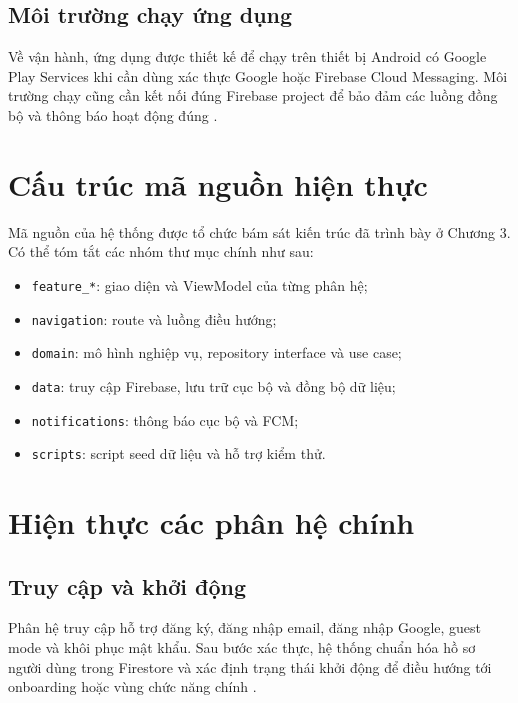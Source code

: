\subsection{Môi trường chạy ứng dụng}

Về vận hành, ứng dụng được thiết kế để chạy trên thiết bị Android có Google Play Services khi cần dùng xác thực Google hoặc Firebase Cloud Messaging. Môi trường chạy cũng cần kết nối đúng Firebase project để bảo đảm các luồng đồng bộ và thông báo hoạt động đúng \cite{firebase_auth,firebase_fcm}.

\section{Cấu trúc mã nguồn hiện thực}

Mã nguồn của hệ thống được tổ chức bám sát kiến trúc đã trình bày ở Chương 3. Có thể tóm tắt các nhóm thư mục chính như sau:

\begin{itemize}
    \item \texttt{feature\_*}: giao diện và ViewModel của từng phân hệ;
    \item \texttt{navigation}: route và luồng điều hướng;
    \item \texttt{domain}: mô hình nghiệp vụ, repository interface và use case;
    \item \texttt{data}: truy cập Firebase, lưu trữ cục bộ và đồng bộ dữ liệu;
    \item \texttt{notifications}: thông báo cục bộ và FCM;
    \item \texttt{scripts}: script seed dữ liệu và hỗ trợ kiểm thử.
\end{itemize}

\section{Hiện thực các phân hệ chính}

\subsection{Truy cập và khởi động}

Phân hệ truy cập hỗ trợ đăng ký, đăng nhập email, đăng nhập Google, guest mode và khôi phục mật khẩu. Sau bước xác thực, hệ thống chuẩn hóa hồ sơ người dùng trong Firestore và xác định trạng thái khởi động để điều hướng tới onboarding hoặc vùng chức năng chính \cite{firebase_auth,firebase_firestore}.

